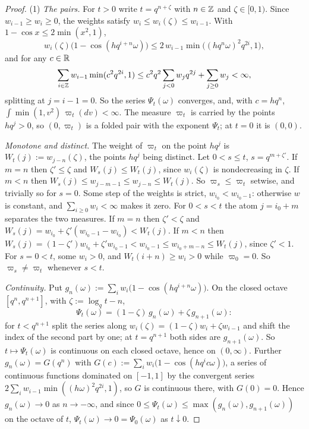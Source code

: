 \begin{proof}
(1) \emph{The pairs.} For $t > 0$ write $t = q^{n+\zeta}$ with $n \in \mathbb{Z}$ and $\zeta \in [0,1)$.
Since $w_{i-1} \ge w_i \ge 0$, the weights satisfy $w_i \le w_i(\zeta) \le w_{i-1}$. With
$1 - \cos x \le 2\min(x^2, 1)$,
\[
  w_i(\zeta)\bigl(1 - \cos(hq^{i+n}\omega)\bigr) \le 2\,w_{i-1}\min\bigl((hq^n\omega)^2q^{2i}, 1\bigr),
\]
and for any $c \in \mathbb{R}$
\[
  \sum_{i \in \mathbb{Z}}w_{i-1}\min(c^2q^{2i}, 1) \le c^2q^2\sum_{j < 0}w_jq^{2j} + \sum_{j \ge 0}w_j
  < \infty ,
\]
splitting at $j = i - 1 = 0$. So the series $\Psi_t(\omega)$ converges, and, with $c = hq^n$,
$\int\min(1, v^2)\,\varpi_t(dv) < \infty$. The measure $\varpi_t$ is carried by the points
$hq^j > 0$, so $(0, \varpi_t)$ is a folded pair with the exponent $\Psi_t$; at $t = 0$ it is
$(0, 0)$.

\emph{Monotone and distinct.} The weight of $\varpi_t$ on the point $hq^j$ is
$W_t(j) := w_{j-n}(\zeta)$, the points $hq^j$ being distinct. Let $0 < s \le t$, $s = q^{m+\zeta'}$.
If $m = n$ then $\zeta' \le \zeta$ and $W_s(j) \le W_t(j)$, since $w_i(\zeta)$ is nondecreasing in
$\zeta$. If $m < n$ then $W_s(j) \le w_{j-m-1} \le w_{j-n} \le W_t(j)$. So
$\varpi_s \le \varpi_t$ setwise, and trivially so for $s = 0$. Some step of the weights is strict,
$w_{i_0} < w_{i_0-1}$: otherwise $w$ is constant, and $\sum_{i \ge 0}w_i < \infty$ makes it zero.
For $0 < s < t$ the atom $j = i_0 + m$ separates the two measures. If $m = n$ then $\zeta' < \zeta$
and $W_s(j) = w_{i_0} + \zeta'(w_{i_0-1} - w_{i_0}) < W_t(j)$. If $m < n$ then
$W_s(j) = (1-\zeta')w_{i_0} + \zeta'w_{i_0-1} < w_{i_0-1} \le w_{i_0+m-n} \le W_t(j)$, since
$\zeta' < 1$. For $s = 0 < t$, some $w_i > 0$, and $W_t(i + n) \ge w_i > 0$ while $\varpi_0 = 0$.
So $\varpi_s \ne \varpi_t$ whenever $s < t$.

\emph{Continuity.} Put $g_n(\omega) := \sum_iw_i\bigl(1 - \cos(hq^{i+n}\omega)\bigr)$. On the closed
octave $[q^n, q^{n+1}]$, with $\zeta := \log_qt - n$,
\[
  \Psi_t(\omega) = (1 - \zeta)\,g_n(\omega) + \zeta\,g_{n+1}(\omega) :
\]
for $t < q^{n+1}$ split the series along $w_i(\zeta) = (1-\zeta)w_i + \zeta w_{i-1}$ and shift the index
of the second part by one; at $t = q^{n+1}$ both sides are $g_{n+1}(\omega)$. So
$t \mapsto \Psi_t(\omega)$ is continuous on each closed octave, hence on $(0,\infty)$. Further
$g_n(\omega) = G(q^n)$ with $G(c) := \sum_iw_i\bigl(1 - \cos(hq^ic\omega)\bigr)$, a series of
continuous functions dominated on $[-1,1]$ by the convergent series
$2\sum_iw_{i-1}\min((h\omega)^2q^{2i}, 1)$, so $G$ is continuous there, with $G(0) = 0$. Hence
$g_n(\omega) \to 0$ as $n \to -\infty$, and since $0 \le \Psi_t(\omega) \le \max(g_n(\omega),
g_{n+1}(\omega))$ on the octave of $t$, $\Psi_t(\omega) \to 0 = \Psi_0(\omega)$ as $t \downarrow 0$.


\end{proof}
